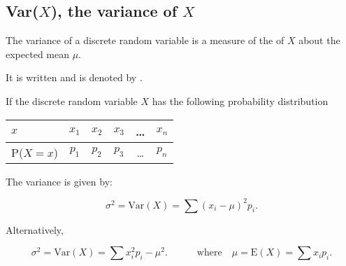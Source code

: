 \newpage	

\subsection{Var($X$), the variance of $X$}	

The variance of a discrete random variable is a measure of the \underline{\hspace{1.5cm}} of $X$ about the expected mean $\mu$.
\medskip


It is written \underline{\hspace{2cm}} and is denoted by \underline{\hspace{2cm}}.

\medskip


If the discrete random variable $X$ has the following probability distribution

\begin{table}[!htpb]
	
	\begin{tabular}{|l|c|c|c|c|c|}
		\hline
		$x $     & $x_1$ & $x_2$ & $x_3$ & \ldots & $x_n$ \\ \hline
		P($X=x$) & $p_1$ & $p_2$ & $p_3$ & \ldots & $p_n$ \\ \hline
	\end{tabular}
\end{table}

The variance is given by:

\[
\sigma^2 = \text{Var}(X)= \sum (x_i-\mu)^2p_i.
\]

Alternatively, 

\[
\sigma^2 = \text{Var}(X)= \sum x_i^2p_i - \mu^2 . \quad \qquad \text{where} \quad \mu = \text{E}(X) =\sum x_i p_i.
\]


\exercise  %

